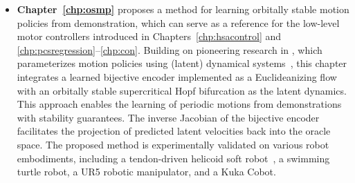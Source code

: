 \begin{itemize}
    \item \textbf{Chapter~\ref{chp:osmp}} proposes a method for learning orbitally stable motion policies from demonstration, which can serve as a reference for the low-level motor controllers introduced in Chapters~\ref{chp:hsacontrol} and \ref{chp:pcsregression}–\ref{chp:con}. Building on pioneering research in , which parameterizes motion policies using (latent) dynamical systems~\citep{ijspeert2013dynamical, rana2020euclideanizing}, this chapter integrates a learned bijective encoder implemented as a Euclideanizing flow~\citep{dinh2016density, rana2020euclideanizing} with an orbitally stable supercritical Hopf bifurcation as the latent dynamics. This approach enables the learning of periodic motions from demonstrations with stability guarantees. The inverse Jacobian of the bijective encoder facilitates the projection of predicted latent velocities back into the oracle space. The proposed method is experimentally validated on various robot embodiments, including a tendon-driven helicoid soft robot~\citep{guan2023trimmed}, a swimming turtle robot, a UR5 robotic manipulator, and a Kuka \gls{Cobot}.
\end{itemize}